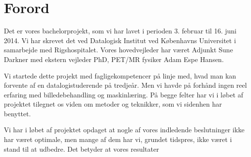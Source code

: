 \section{Forord}

Det er vores bachelorprojekt, som vi har lavet i perioden 3. februar til 16.
juni 2014. Vi har skrevet det ved Datalogisk Institut ved Københavns Universitet
i samarbejde med Rigshospitalet. Vores hovedvejleder har været Adjunkt Sune
Darkner med ekstern vejleder PhD, PET/MR fysiker Adam Espe Hansen.

Vi startede dette projekt med fagligekompetencer på linje med, hvad man
kan forvente af en datalogistuderende på tredjeår. Men vi havde på forhånd
ingen reel erfaring med billedebehandling og maskinlæring. På begge felter
har vi i løbet af projektet tilegnet os viden om metoder og teknikker, som
vi sidenhen har benyttet. 

Vi har i løbet af projektet opdaget at nogle af vores indledende
beslutninger ikke har været optimale, men mange af dem har vi, grundet
tidspres, ikke været i stand til at udbedre. Det betyder at vores
resultater 
